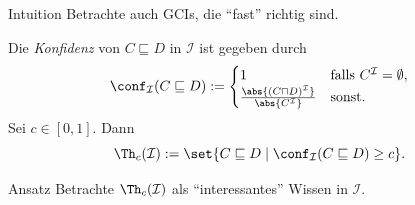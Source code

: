 \documentclass[ngerman]{beamer}
\begin{document}
\begin{frame}

  \onslide<+->

  \begin{block}{Intuition}
    Betrachte auch GCIs, die \enquote{fast} richtig sind.
  \end{block}

  \onslide<+->
  \begin{Definition}
    Die \emph{Konfidenz} von $C \sqsubseteq D$ in $\mathcal{I}$ ist gegeben durch
    \begin{equation*}
      \conf_{\mathcal{I}}(C \sqsubseteq D) :=
      \begin{cases}
        1 & \text{falls } C^{\mathcal{I}} = \emptyset,\\
        \frac{\abs{(C \sqcap D)^{\mathcal{I}}}}{\abs{C^{\mathcal{I}}}} & \text{sonst}.
      \end{cases}
    \end{equation*}
    \onslide<+->%
    Sei $c \in [0, 1]$.  Dann
    \begin{equation*}
      \Th_c(\mathcal{I}) := \set{ C \sqsubseteq D \mid \conf_{\mathcal{I}}(C \sqsubseteq
        D) \ge c}.
    \end{equation*}
  \end{Definition}

  \onslide<+->

  \begin{block}{Ansatz}
    Betrachte $\Th_{c}(\mathcal{I})$ als \enquote{interessantes} Wissen in $\mathcal{I}$.
  \end{block}

\end{frame}
\end{document}
